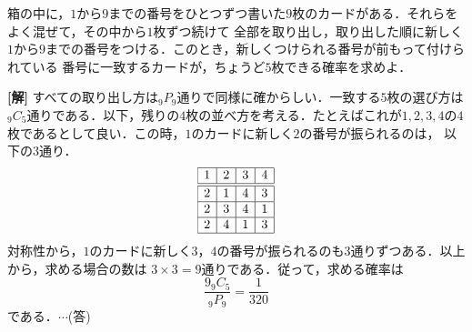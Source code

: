 \documentclass[a4j]{jarticle}
\begin{document}

     \begin{oframed}
     箱の中に，$1$から$9$までの番号をひとつずつ書いた$9$枚のカードがある．それらをよく混ぜて，その中から$1$枚ずつ続けて
     全部を取り出し，取り出した順に新しく$1$から$9$までの番号をつける．このとき，新しくつけられる番号が前もって付けられている
     番号に一致するカードが，ちょうど$5$枚できる確率を求めよ．
     \end{oframed}

\setlength{\columnseprule}{0.4pt}
\begin{multicols}{2}
{\bf[解]} すべての取り出し方は${}_9P_9$通りで同様に確からしい．一致する$5$枚の選び方は${}_9C_5$通りである．以下，残りの$4$枚の並べ方を考える．たとえばこれが$1,2,3,4$の$4$枚であるとして良い．この時，$1$のカードに新しく$2$の番号が振られるのは，
以下の$3$通り．
     \begin{align*}
          \begin{array}{|c|c|c|c|} \hline
          1&2&3&4 \\ \hline\hline
          2&1&4&3 \\ \hline
          2&3&4&1 \\ \hline
          2&4&1&3 \\ \hline
          \end{array}
     \end{align*}
対称性から，$1$のカードに新しく$3$，$4$の番号が振られるのも$3$通りずつある．以上から，求める場合の数は
$3×3=9$通りである．従って，求める確率は
     \[\frac{9{}_9C_5}{{}_9P_9}=\frac{1}{320}\]
である．$\cdots$(答)
     
\newpage
\end{multicols}
\end{document}

